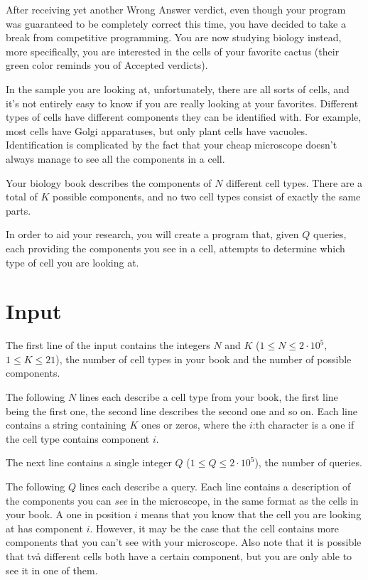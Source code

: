 \noindent
After receiving yet another Wrong Answer verdict, even though your program was guaranteed to be completely correct
this time, you have decided to take a break from competitive programming. You are now studying biology instead, more
specifically, you are interested in the cells of your favorite cactus (their green color reminds you of Accepted verdicts).

In the sample you are looking at, unfortunately, there are all sorts of cells, and it's not entirely easy to
know if you are really looking at your favorites. Different types of cells have different components they
can be identified with. For example, most cells have Golgi apparatuses, but only plant cells have vacuoles.
Identification is complicated by the fact that your cheap microscope doesn't always manage to see all the components in a cell.

Your biology book describes the components of $N$ different cell types. There are a total of $K$ possible
components, and no two cell types consist of exactly the same parts.

In order to aid your research, you will create a program that, given $Q$ queries, each providing the components you see in
a cell, attempts to determine which type of cell you are looking at.

\section*{Input}
The first line of the input contains the integers $N$ and $K$ ($1 \leq N \leq 2 \cdot 10^5$, $1 \leq K \leq 21$),
the number of cell types in your book and the number of possible components.

The following $N$ lines each describe a cell type from your book, the first line being the first one, 
the second line describes the second one and so on. Each line contains a string containing $K$ ones or zeros,
where the $i$:th character is a one if the cell type contains component $i$.

The next line contains a single integer $Q$ ($1 \leq Q \leq 2\cdot 10^5$), the number of queries.

The following $Q$ lines each describe a query. Each line contains a description of the components you can \textit{see}
in the microscope, in the same format as the cells in your book. A one in position $i$ means that you know that the cell
you are looking at has component $i$. However, it may be the case that the cell contains more components that you can't
see with your microscope. Also note that it is possible that två different cells both have a certain component, but
you are only able to see it in one of them.

